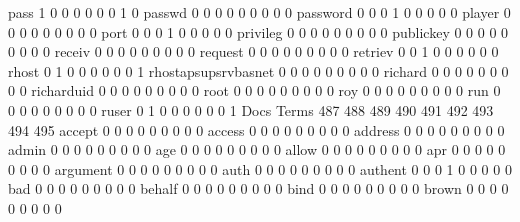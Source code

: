 \documentclass[compress,8pt]{beamer}
\begin{document}
\begin{frame}
\begin{Schunk}
  pass                                       1   0   0   0   0   0   0   1   0
  passwd                                     0   0   0   0   0   0   0   0   0
  password                                   0   0   0   1   0   0   0   0   0
  player                                     0   0   0   0   0   0   0   0   0
  port                                       0   0   0   1   0   0   0   0   0
  privileg                                   0   0   0   0   0   0   0   0   0
  publickey                                  0   0   0   0   0   0   0   0   0
  receiv                                     0   0   0   0   0   0   0   0   0
  request                                    0   0   0   0   0   0   0   0   0
  retriev                                    0   0   1   0   0   0   0   0   0
  rhost                                      0   1   0   0   0   0   0   0   1
  rhostapsupsrvbasnet                        0   0   0   0   0   0   0   0   0
  richard                                    0   0   0   0   0   0   0   0   0
  richarduid                                 0   0   0   0   0   0   0   0   0
  root                                       0   0   0   0   0   0   0   0   0
  roy                                        0   0   0   0   0   0   0   0   0
  run                                        0   0   0   0   0   0   0   0   0
  ruser                                      0   1   0   0   0   0   0   0   1
                                          Docs
Terms                                      487 488 489 490 491 492 493 494 495
  accept                                     0   0   0   0   0   0   0   0   0
  access                                     0   0   0   0   0   0   0   0   0
  address                                    0   0   0   0   0   0   0   0   0
  admin                                      0   0   0   0   0   0   0   0   0
  age                                        0   0   0   0   0   0   0   0   0
  allow                                      0   0   0   0   0   0   0   0   0
  apr                                        0   0   0   0   0   0   0   0   0
  argument                                   0   0   0   0   0   0   0   0   0
  auth                                       0   0   0   0   0   0   0   0   0
  authent                                    0   0   0   1   0   0   0   0   0
  bad                                        0   0   0   0   0   0   0   0   0
  behalf                                     0   0   0   0   0   0   0   0   0
  bind                                       0   0   0   0   0   0   0   0   0
  brown                                      0   0   0   0   0   0   0   0   0

\end{Schunk}
\end{frame}
\end{document}

